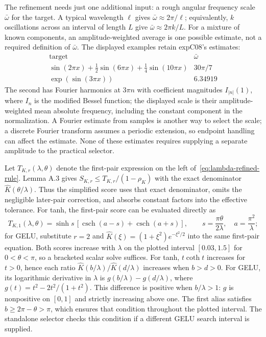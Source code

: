 \documentclass[11pt]{article}
\begin{document}
The refinement needs just one additional input: a rough angular frequency
scale $\bar\omega$ for the target. A typical wavelength $\ell$ gives
$\bar\omega\approx2\pi/\ell$; equivalently, $k$ oscillations across an
interval of length $L$ give $\bar\omega\approx2\pi k/L$.
For a mixture of known components, an amplitude-weighted average is one
possible estimate, not a required definition of $\bar\omega$.
The displayed examples retain expC08's estimates:
\[
\begin{array}{c|c}
\text{target}&\bar\omega\\\hline
\sin(2\pi x)+\tfrac12\sin(6\pi x)+\tfrac14\sin(10\pi x)&30\pi/7\\
\exp(\sin(3\pi x))&6.34919
\end{array}
\]
The second has Fourier harmonics at $3\pi n$ with coefficient magnitudes
$I_{|n|}(1)$, where $I_n$ is the modified Bessel function; the displayed
scale is their amplitude-weighted mean absolute frequency, including the
constant component in the normalization.
A Fourier estimate from samples is another way to select the scale; a
discrete Fourier transform assumes a periodic extension, so endpoint
handling can affect the estimate. None of these estimates requires
supplying a separate amplitude to the practical selector.

Let $T_{K,r}(\lambda,\theta)$ denote the first-pair expression on the
left of~\eqref{eq:lambda-refined-rule}. Lemma A.3 gives
$S_{K,r}\le T_{K,r}/(1-\rho_K)$ with the exact denominator
$\widehat K(\theta/\lambda)$. Thus the simplified score uses that exact
denominator, omits the negligible later-pair correction, and absorbs
constant factors into the effective tolerance. For tanh, the first-pair
score can be evaluated directly as
\[
 T_{K,1}(\lambda,\theta)=\sinh s\,
 [\operatorname{csch}(a-s)+\operatorname{csch}(a+s)],\qquad
 s=\frac{\pi\theta}{2\lambda},\quad a=\frac{\pi^2}{\lambda};
\]
for GELU, substitute $r=2$ and
$\widehat K(\xi)=(1+\xi^2)e^{-\xi^2/2}$ into the same first-pair equation.
Both scores increase with $\lambda$ on the plotted interval $[0.03,1.5]$
for $0<\theta<\pi$, so a bracketed scalar solve suffices.
For tanh, $t\coth t$ increases for $t>0$, hence each ratio
$\widehat K(b/\lambda)/\widehat K(d/\lambda)$ increases when $b>d>0$.
For GELU, its logarithmic derivative in $\lambda$ is
$g(b/\lambda)-g(d/\lambda)$, where
$g(t)=t^2-2t^2/(1+t^2)$. This difference is positive when $b/\lambda>1$:
$g$ is nonpositive on $[0,1]$ and strictly increasing above one.
The first alias satisfies $b\ge2\pi-\theta>\pi$, which ensures that
condition throughout the plotted interval. The standalone selector checks
this condition if a different GELU search interval is supplied.
\end{document}
